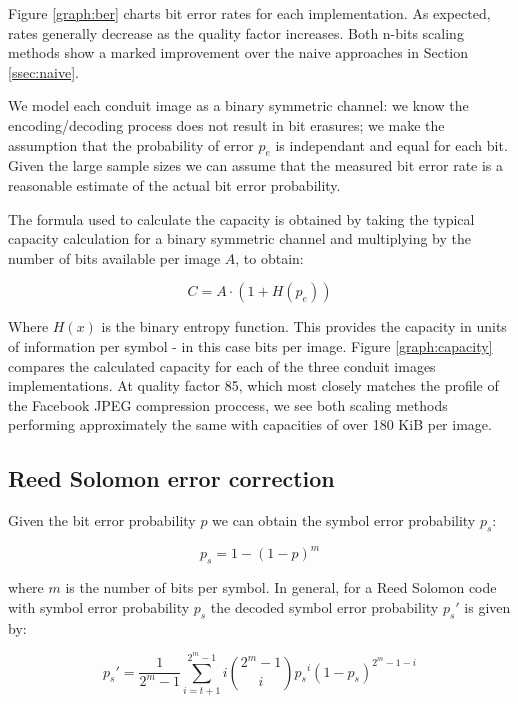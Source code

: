 Figure \ref{graph:ber} charts bit error rates for each implementation. As expected, rates generally decrease as the quality factor increases. Both n-bits scaling methods show a marked improvement over the naive approaches in Section \ref{ssec:naive}.



We model each conduit image as a binary symmetric channel: we know the encoding/decoding process does not result in bit erasures; we make the assumption that the probability of error $p_e$ is independant and equal for each bit. Given the large sample sizes we can assume that the measured bit error rate is a reasonable estimate of the actual bit error probability.

The formula used to calculate the capacity is obtained by taking the typical capacity calculation for a binary symmetric channel and multiplying by the number of bits available per image $A$, to obtain:

\begin{equation}
    C = A \cdot (1 + H(p_e))
\end{equation}

Where $H(x)$ is the binary entropy function. This provides the capacity in units of information per symbol - in this case bits per image. Figure \ref{graph:capacity} compares the calculated capacity for each of the three conduit images implementations. At quality factor 85, which most closely matches the profile of the Facebook JPEG compression proccess, we see both scaling methods performing approximately the same with capacities of over 180 KiB per image.


\subsection{Reed Solomon error correction}

Given the bit error probability $p$ we can obtain the symbol error probability $p_s$:

\begin{equation}
    p_s = 1 - (1-p)^m
\end{equation}

where $m$ is the number of bits per symbol. In general, for a Reed Solomon code with symbol error probability $p_s$ the decoded symbol error probability $p_s'$ is given by:

\begin{equation}
    p_s' = \frac{1}{2^m -1} \sum^{2^m - 1}_{i = t+1} i {{2^m - 1}\choose{i}} {p_s}^i (1-{p_s})^{2^m - 1 - i}
\end{equation}

